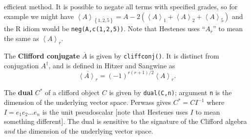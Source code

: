 \documentclass{birkjour}
\theoremstyle{definition}
\theoremstyle{remark}
\numberwithin{equation}{section}
\begin{document}
{      efficient method.  It is possible to negate all terms with
      specified grades, so for example we might have ${\left\langle
        A\right\rangle_{\overline{\left\lbrace 1,2,5\right\rbrace}} =
        A-2\left( \left\langle A\right\rangle_1 +\left\langle
        A\right\rangle_2+\left\langle A\right\rangle_5\right)}$ and
      the R idiom would be {\tt neg(A,c(1,2,5))}.  Note that Hestenes
      uses ``${A_{\overline{r}}}$'' to mean the same as
      ${\left\langle A\right\rangle_r}$.
    \item The {\bf Clifford conjugate} ${\overline{A}}$ is given by
      {\tt cliffconj()}.  It is distinct from conjugation
      ${A^\dagger}$, and is defined in Hitzer and Sangwine as
    $$
    {\overline{\left\langle A\right\rangle_r} =
      (-1)^{r(r+1)/2}\left\langle A\right\rangle_r.}
    $$
    \item The {\bf dual} ${C^*}$ of a clifford object ${C}$ is given
      by {\tt dual(C,n)}; argument {\tt n} is the dimension of the
      underlying vector space.  Perwass gives ${C^*=CI^{-1}}$ where
      ${I=e_1e_2\ldots e_n}$ is the unit pseudoscalar [note that
        Hestenes uses ${I}$ to mean something different].  The dual is
      sensitive to the signature of the Clifford algebra \emph{and}
      the dimension of the underlying vector space.
      }
\end{document}
